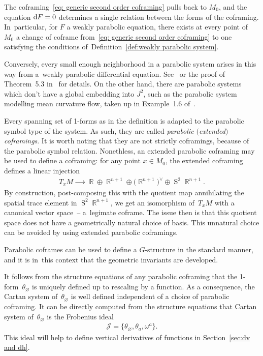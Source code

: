 \documentclass[10pt,a4paper]{amsart}
\DeclareMathOperator{\R}{\mathbb{R}}
\DeclareMathOperator{\Sym}{S}
\renewcommand{\d}{{\rm d}}
\newcommand{\thetas}[1]{\theta_{#1}}
\newcommand{\cartTheta}{\mathcal{J}}
\newcommand{\jets}{J^2}
\numberwithin{equation}{section}
\begin{document}
\begin{Remark}
 The coframing~\eqref{eq: generic second order coframing} pulls back to $ M_0 $, and the equation $ \d F = 0 $ determines a single relation between the forms of the coframing.
 In~particular, for $ F $ a weakly parabolic equation, there exists at every point of~$ M_0 $ a change of coframe from~\eqref{eq: generic second order coframing} to one satisfying the conditions of~Definition~\ref{def:weakly parabolic system}.

 Conversely, every small enough neighborhood in a parabolic system arises in this way from a~weakly parabolic differential equation.
 See~\cite[Theorem~5.10]{BCGGG} or the proof of Theorem~5.3 in~\cite{McMillan:ParabolicsI} for details.
 On the other hand, there are parabolic systems which don't have a global embedding into $\jets$, such as the parabolic system modelling mean curvature flow, taken up in Example~1.6 of~\cite{McMillan:ParabolicsI}.
\end{Remark}

\begin{Remark}\label{rmk: parabolic G structure}
 Every spanning set of 1-forms as in the definition is adapted to the parabolic symbol type of the system. As such, they are called \emph{parabolic $($extended$)$ coframings}. It is worth noting that they are not strictly coframings, because of the parabolic symbol relation. Nonethless, an extended parabolic coframing may be used to define a coframing: for any point $x \in M_0$, the extended coframing defines a linear injection
 \begin{gather*}
 T_xM \xrightarrow{\qquad} \R \oplus \R^{n+1} \oplus \big(\R^{n+1}\big)^\vee \oplus \Sym^2\R^{n+1} .
 \end{gather*}
 By construction, post-composing this with the quotient map annihilating the spatial trace element in $\Sym^2 \R^{n+1}$, we get an isomorphism of~$T_xM$ with a canonical vector space~-- a~legimate coframe. The issue then is that this quotient space does not have a geometrically natural choice of basis. This unnatural choice can be avoided by using extended parabolic coframings.

 Parabolic coframes can be used to define a $G$-structure in the standard manner, and it is in~this context that the geometric invariants are developed.
\end{Remark}

\begin{Remark}\label{rmk: Cartan system}
 It follows from the structure equations of any parabolic coframing that the 1-form~$\thetas{\varnothing}$ is uniquely defined up to rescaling by a function. As a consequence, the Cartan system of~$\thetas{\varnothing}$ is well defined independent of a choice of parabolic coframing. It can be directly computed from the structure equations that Cartan system of~$\thetas{\varnothing}$ is the Frobenius ideal
 \begin{gather*}
 \cartTheta = \{ \thetas{\varnothing}, \thetas{a}, \omega^a \} .
 \end{gather*}
 This ideal will help to define vertical derivatives of functions in Section~\ref{sec:dv and dh}.
\end{Remark}
\end{document}
